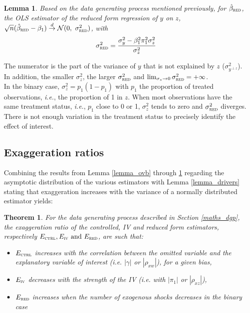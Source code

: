 \documentclass[usletter, 12pt]{article}
\newtheorem{theorem}{Theorem}
\newtheorem{lemma}{Lemma}
\begin{document}
				\begin{lemma}\label{lemma_red}
					Based on the data generating process mentioned previously, for $\hat{\beta}_{\textsc{red}}$, the OLS estimator of the reduced form regression of $y$ on $z$,  $\sqrt{n} (\hat{\beta}_{\textsc{red}} - \beta_{1} ) \overset{d}{\to} \mathcal{N}(0, \ \sigma_{\textsc{red}}^{2})$, with
					\[
						\sigma_{\textsc{red}}^{2} = \dfrac{\sigma_{y}^{2} - \beta_{1}^{2}\pi_{1}^{2}\sigma_{z}^{2}}{\sigma_{z}^{2}}
					\]
				\end{lemma}
				
				The numerator is the part of the variance of $y$ that is not explained by $z$ ($\sigma^{2}_{y^{\perp z}}$). In addition, the smaller $\sigma_{z}^{2}$, the larger $\sigma_{\textsc{red}}^{2}$ and $\lim_{\sigma_{z}\to 0} \sigma_{\textsc{red}}^{2} = + \infty$.\\
				
				In the binary case, $\sigma_{z}^{2} = p_{1}(1-p_{1})$ with $p_{1}$ the proportion of treated observations, \textit{i.e.}, the proportion of 1 in $z$. When most observations have the same treatment status, \textit{i.e.}, $p_{1}$ close to 0 or 1, $\sigma_{z}^{2}$ tends to zero and $\sigma_{\textsc{red}}^{2}$ diverges. There is not enough variation in the treatment status to precisely identify the effect of interest. 
				
		\subsection{Exaggeration ratios}
		
			Combining the results from Lemma \ref{lemma_ovb} through \ref{lemma_red}  regarding the asymptotic distribution of the various estimators with Lemma \ref{lemma_drivers} stating that exaggeration increases with the variance of a normally distributed estimator yields:
			~
			\begin{theorem}
				For the data generating process described in Section \ref{maths_dgp}, the exaggeration ratio of the controlled, IV and reduced form estimators, respectively $E_{\textsc{ctrl}}, E_{\textsc{iv}} \text{ and } E_{\textsc{red}}$, are such that:
					\begin{itemize}
						\item $E_{\textsc{ctrl}}$ increases with the correlation between the omitted variable and the explanatory variable of interest (\textit{i.e.} $|\gamma|$ or $|\rho_{xw}|$), for a given bias,
						\item $E_{\textsc{iv}}$ decreases with the strength of the IV (\textit{i.e.} with $|\pi_{1}|$ or $|\rho_{xz}|$),
						\item $E_{\textsc{red}}$ increases when the number of exogenous shocks decreases in the binary case
					\end{itemize}
			\end{theorem}
			
\end{document}
